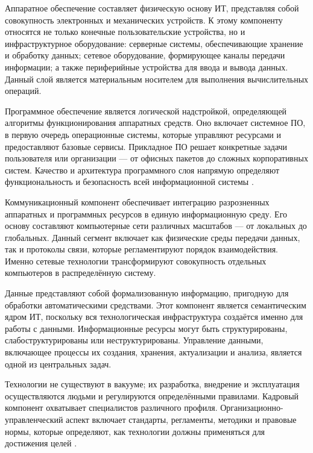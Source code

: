 \documentclass{SibFU-docs}
\begin{document}

Аппаратное обеспечение составляет физическую основу ИТ, представляя собой совокупность электронных и механических устройств. К этому компоненту относятся не только конечные пользовательские устройства, но и инфраструктурное оборудование: серверные системы, обеспечивающие хранение и обработку данных; сетевое оборудование, формирующее каналы передачи информации; а также периферийные устройства для ввода и вывода данных. Данный слой является материальным носителем для выполнения вычислительных операций.


Программное обеспечение является логической надстройкой, определяющей алгоритмы функционирования аппаратных средств. Оно включает системное ПО, в первую очередь операционные системы, которые управляют ресурсами и предоставляют базовые сервисы. Прикладное ПО решает конкретные задачи пользователя или организации — от офисных пакетов до сложных корпоративных систем. Качество и архитектура программного слоя напрямую определяют функциональность и безопасность всей информационной системы \cite{techopedia_it_components}.


Коммуникационный компонент обеспечивает интеграцию разрозненных аппаратных и программных ресурсов в единую информационную среду. Его основу составляют компьютерные сети различных масштабов — от локальных до глобальных. Данный сегмент включает как физические среды передачи данных, так и протоколы связи, которые регламентируют порядок взаимодействия. Именно сетевые технологии трансформируют совокупность отдельных компьютеров в распределённую систему.


Данные представляют собой формализованную информацию, пригодную для обработки автоматическими средствами. Этот компонент является семантическим ядром ИТ, поскольку вся технологическая инфраструктура создаётся именно для работы с данными. Информационные ресурсы могут быть структурированы, слабоструктурированы или неструктурированы. Управление данными, включающее процессы их создания, хранения, актуализации и анализа, является одной из центральных задач.


Технологии не существуют в вакууме; их разработка, внедрение и эксплуатация осуществляются людьми и регулируются определёнными правилами. Кадровый компонент охватывает специалистов различного профиля. Организационно-управленческий аспект включает стандарты, регламенты, методики и правовые нормы, которые определяют, как технологии должны применяться для достижения целей \cite{habr_digital_env}.
\end{document}
